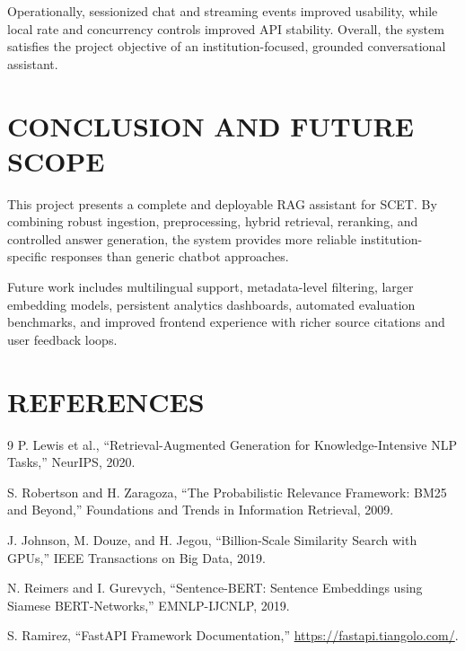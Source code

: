 \documentclass[12pt,a4paper]{report}
\begin{document}
\hspace*{1cm}Operationally, sessionized chat and streaming events improved usability, while local rate and concurrency controls improved API stability. Overall, the system satisfies the project objective of an institution-focused, grounded conversational assistant.

\chapter{CONCLUSION AND FUTURE SCOPE}
\thispagestyle{fancy}
\onehalfspacing

\hspace*{1cm}This project presents a complete and deployable RAG assistant for SCET. By combining robust ingestion, preprocessing, hybrid retrieval, reranking, and controlled answer generation, the system provides more reliable institution-specific responses than generic chatbot approaches.

\hspace*{1cm}Future work includes multilingual support, metadata-level filtering, larger embedding models, persistent analytics dashboards, automated evaluation benchmarks, and improved frontend experience with richer source citations and user feedback loops.

\chapter*{REFERENCES}
\begin{thebibliography}{9}
P. Lewis et al., ``Retrieval-Augmented Generation for Knowledge-Intensive NLP Tasks,'' NeurIPS, 2020.

S. Robertson and H. Zaragoza, ``The Probabilistic Relevance Framework: BM25 and Beyond,'' Foundations and Trends in Information Retrieval, 2009.

J. Johnson, M. Douze, and H. Jegou, ``Billion-Scale Similarity Search with GPUs,'' IEEE Transactions on Big Data, 2019.

N. Reimers and I. Gurevych, ``Sentence-BERT: Sentence Embeddings using Siamese BERT-Networks,'' EMNLP-IJCNLP, 2019.

S. Ramirez, ``FastAPI Framework Documentation,'' \url{https://fastapi.tiangolo.com/}.
\end{thebibliography}

\appendix
\end{document}
